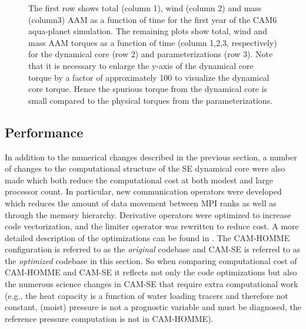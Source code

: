 \documentclass{agujournal}
\begin{document}
{\begin{figure}[h]
\caption{The first row shows total (column 1), wind (column 2) and mass (column3) AAM as a function of time for the first year of the CAM6 aqua-planet simulation. The remaining plots show total, wind and mass AAM torques as a function of time (column 1,2,3, respectively) for the dynamical core (row 2) and parameterizations (row 3). Note that it is necessary to enlarge the y-axis of the dynamical core torque by a factor of approximately 100 to visualize the dynamical core torque. Hence the spurious torque from the dynamical core is small compared to the physical torques from the parameterizations.}
\label{fig:aam}
\end{figure}
\subsection{Performance}\label{sec:performance}
In addition to the numerical changes described in the previous section, a number of changes to the computational structure of the SE dynamical core were also made which both reduce the computational cost at both modest and large processor count.  In particular, new communication operators were developed which reduces the amount of data movement between MPI ranks as well as through the memory hierarchy. Derivative operators were optimized to increase code vectorization, and the limiter operator was rewritten to reduce cost.  A more detailed description of the optimizations can be found in \cite{dennis2017}. The CAM-HOMME configuration is referred to as the {\em{original}} codebase and CAM-SE is referred to as the {\em{optimized}} codebase in this section. So when comparing computational cost of CAM-HOMME and CAM-SE it reflects not only the code optimizations but also the numerous science changes in CAM-SE that require extra computational work (e.g., the heat capacity is a function of water loading tracers and therefore not constant, (moist) pressure is not a prognostic variable and must be diagnosed, the reference pressure computation is not in CAM-HOMME).

}
\end{document}
